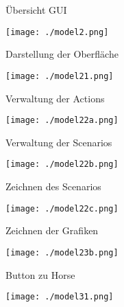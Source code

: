 \newcommand\tab[1][1cm]{\hspace*{#1}}
\graphicspath{{images/}{images/logos/}}
\begin{frame}{Übersicht GUI}
	\begin{center}
		\texttt{[image: ./model2.png]}
	\end{center}
\end{frame}

\begin{frame}{Darstellung der Oberfläche}
	\begin{center}
		\texttt{[image: ./model21.png]}
	\end{center}
\end{frame}

\begin{frame}{Verwaltung der Actions}
	\begin{center}
		\texttt{[image: ./model22a.png]}
	\end{center}
\end{frame}


\begin{frame}{Verwaltung der Scenarios}
	\begin{center}
		\texttt{[image: ./model22b.png]}
	\end{center}
\end{frame}


\begin{frame}{Zeichnen des Scenarios}
	\begin{center}
		\texttt{[image: ./model22c.png]}
	\end{center}
\end{frame}


\begin{frame}{Animation der Simulation
	\begin{center}
		\texttt{[image: ./model23a.png]}
	\end{center}
\end{frame}

\begin{frame}{Zeichnen der Grafiken}
	\begin{center}
		\texttt{[image: ./model23b.png]}
	\end{center}
\end{frame}


\begin{frame}{Button zu Horse}
	\begin{center}
		\texttt{[image: ./model31.png]}
	\end{center}
\end{frame}


